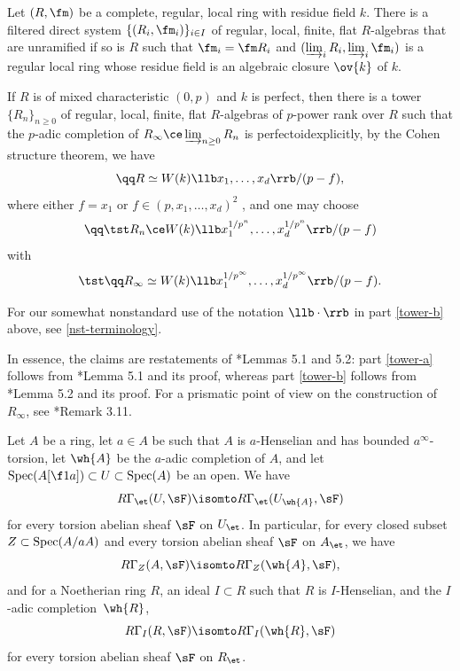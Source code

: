 \blem \label{lem:towers}
Let $(R, \fm)$ be a complete, regular, local ring with residue field $k$.
\benum
\m \label{tower-a}
There is a filtered direct system $\{(R_i, \fm_i)\}_{i \in I}$ of regular, local, finite, flat $R$-algebras that are unramified if so is $R$  such that $\fm_i = \fm R_i$ %
and $(\varinjlim_i R_i, \varinjlim_i \fm_i)$ is a regular local ring whose residue field is an algebraic closure $\ov{k}$ of $k$.

\m \label{tower-b}
If $R$ is of mixed characteristic $(0, p)$ and $k$ is perfect, then there is a tower $\{R_n\}_{n \ge 0}$ of regular, local, finite, flat $R$-algebras of $p$-power rank over $R$ such that the $p$-adic completion of $R_\infty \ce \varinjlim_{n \ge 0} R_n$ is perfectoid\ucolon explicitly, by the Cohen structure theorem, we have
\[%
\qq R \simeq W(k)\llb x_1, \dotsc, x_d\rrb/(p - f),
\]
where either $f = x_1$ or $f \in (p, x_1, \dotsc, x_d)^2$ , %
and one may choose
\[
\qq \tst R_n \ce W(k)\llb x_1^{1/p^n}, \dotsc, x_d^{1/p^n} \rrb/(p - f)
\]
with
\[
\tst \qq R_\infty \simeq W(k)\llb x_1^{1/p^\infty}, \dotsc, x_d^{1/p^\infty} \rrb/(p - f).
\]
\eenum
\elem

For our somewhat nonstandard use of the notation $\llb \cdot \rrb$ in part \ref{tower-b} above, see \eqref{nst-terminology}.



\bpf
In essence, the claims are restatements of \cite{brauer-purity}*{Lemmas 5.1 and 5.2}: part \ref{tower-a} follows from \cite{brauer-purity}*{Lemma 5.1} and its proof, whereas part \ref{tower-b} follows from \cite{brauer-purity}*{Lemma 5.2} and its proof. For a prismatic point of view on the construction of $R_\infty$, see \cite{BS19}*{Remark 3.11}.
\epf




\blem \label{lem:et-to-hat}
Let $A$ be a ring, let $a \in A$ be such that $A$ is $a$-Henselian and has bounded $a^\infty$-torsion, %
let $\wh{A}$ be the $a$-adic completion of $A$, and let $\Spec(A[\f 1a]) \subset U \subset \Spec(A)$ be an open. We have
\[
R\Gamma_\et(U, \sF) \isomto R\Gamma_\et(U_{\wh{A}}, \sF)
\]
for every torsion abelian sheaf $\sF$ on $U_\et$. In particular, for every closed subset $Z \subset \operatorname{Spec}(A/aA)$ and every torsion abelian sheaf $\sF$ on $A_\et$, we have
\[
R\Gamma_Z(A, \sF) \isomto R\Gamma_Z(\wh{A}, \sF),
\]
and for a Noetherian ring $R$, an ideal $I \subset R$ such that $R$ is  $I$-Henselian,  and the $I$-adic completion~$\wh{R}$,
\[
R\Gamma_I(R, \sF) \isomto R\Gamma_I(\wh{R}, \sF)
\]
for every torsion abelian sheaf $\sF$ on $R_\et$.
\elem

